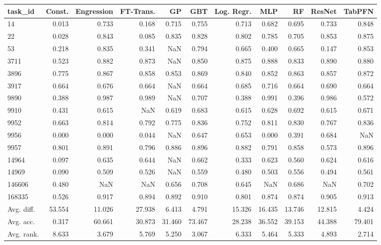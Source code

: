 \begin{tabular}{lrrrrrrrrrr}
\toprule
task\_id & Const. & Engression & FT-Trans. & GP & GBT & Log. Regr. & MLP & RF & ResNet & TabPFN \\
\midrule
14 & 0.013 & 0.733 & 0.168 & 0.715 & 0.755 & 0.713 & 0.682 & 0.695 & 0.733 & 0.848 \\
22 & 0.028 & 0.843 & 0.085 & 0.835 & 0.828 & 0.802 & 0.785 & 0.705 & 0.853 & 0.875 \\
53 & 0.218 & 0.835 & 0.341 & NaN & 0.794 & 0.665 & 0.400 & 0.665 & 0.147 & 0.853 \\
3711 & 0.523 & 0.882 & 0.873 & NaN & 0.850 & 0.875 & 0.888 & 0.833 & 0.890 & 0.880 \\
3896 & 0.775 & 0.867 & 0.858 & 0.853 & 0.869 & 0.840 & 0.852 & 0.863 & 0.857 & 0.872 \\
3917 & 0.664 & 0.676 & 0.664 & NaN & 0.664 & 0.685 & 0.716 & 0.664 & 0.690 & 0.664 \\
9890 & 0.388 & 0.987 & 0.989 & NaN & 0.707 & 0.388 & 0.991 & 0.396 & 0.986 & 0.572 \\
9910 & 0.431 & 0.615 & NaN & 0.619 & 0.683 & 0.615 & 0.628 & 0.692 & 0.615 & 0.671 \\
9952 & 0.663 & 0.814 & 0.792 & 0.775 & 0.836 & 0.752 & 0.811 & 0.830 & 0.767 & 0.836 \\
9956 & 0.000 & 0.000 & 0.044 & NaN & 0.647 & 0.653 & 0.000 & 0.391 & 0.684 & NaN \\
9957 & 0.801 & 0.891 & 0.796 & 0.886 & 0.896 & 0.882 & 0.791 & 0.858 & 0.573 & 0.896 \\
14964 & 0.097 & 0.635 & 0.644 & NaN & 0.662 & 0.333 & 0.623 & 0.560 & 0.624 & 0.616 \\
14969 & 0.090 & 0.509 & 0.526 & NaN & 0.559 & 0.480 & 0.503 & 0.556 & 0.494 & 0.561 \\
146606 & 0.480 & NaN & NaN & 0.656 & 0.708 & 0.645 & NaN & 0.686 & NaN & 0.702 \\
168335 & 0.526 & 0.917 & 0.894 & 0.892 & 0.910 & 0.801 & 0.874 & 0.874 & 0.905 & 0.913 \\
Avg. diff. & 53.554 & 11.026 & 27.938 & 6.413 & 4.791 & 15.326 & 16.435 & 13.746 & 12.815 & 4.424 \\
Avg. acc. & 0.317 & 60.661 & 30.873 & 31.460 & 73.467 & 28.238 & 36.552 & 39.153 & 44.388 & 79.401 \\
Avg. rank. & 8.633 & 3.679 & 5.769 & 5.250 & 3.067 & 6.333 & 5.464 & 5.333 & 4.893 & 2.714 \\
\bottomrule
\end{tabular}
